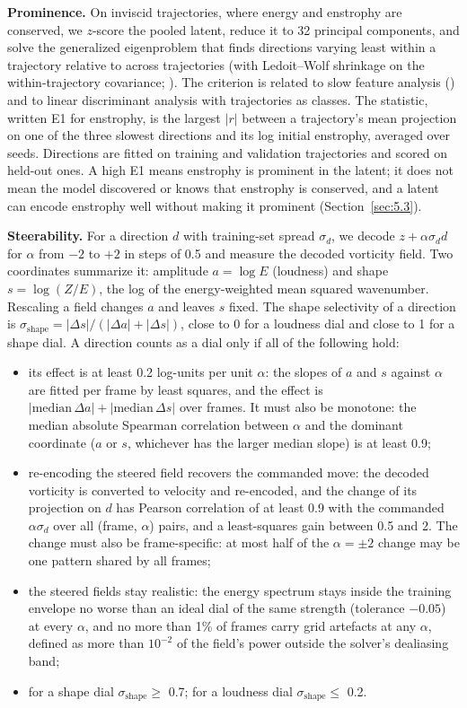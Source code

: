 \documentclass[10pt]{article}
\begin{document}
\textbf{Prominence.} On inviscid trajectories, where energy and enstrophy are conserved, we $z$-score the pooled latent, reduce it to 32 principal components, and solve the generalized eigenproblem that finds directions varying least within a trajectory relative to across trajectories (with Ledoit--Wolf shrinkage on the within-trajectory covariance; \citealp{ledoit2004}). The criterion is related to slow feature analysis (\citealp{wiskott2002sfa}) and to linear discriminant analysis with trajectories as classes. The statistic, written E1 for enstrophy, is the largest $|r|$ between a trajectory's mean projection on one of the three slowest directions and its log initial enstrophy, averaged over seeds. Directions are fitted on training and validation trajectories and scored on held-out ones. A high E1 means enstrophy is prominent in the latent; it does not mean the model discovered or knows that enstrophy is conserved, and a latent can encode enstrophy well without making it prominent (Section~\ref{sec:5.3}).

\textbf{Steerability.} For a direction $d$ with training-set spread $\sigma_d$, we decode $z + \alpha\sigma_d d$ for $\alpha$ from $-2$ to $+2$ in steps of 0.5 and measure the decoded vorticity field. Two coordinates summarize it: amplitude $a = \log E$ (loudness) and shape $s = \log(Z/E)$, the log of the energy-weighted mean squared wavenumber. Rescaling a field changes $a$ and leaves $s$ fixed. The shape selectivity of a direction is $\sigma_{\mathrm{shape}} = |\Delta s| / (|\Delta a| + |\Delta s|)$, close to 0 for a loudness dial and close to 1 for a shape dial. A direction counts as a dial only if all of the following hold:

\begin{itemize}
\item its effect is at least 0.2 log-units per unit $\alpha$: the slopes of $a$ and $s$ against $\alpha$ are fitted per frame by least squares, and the effect is $|\mathrm{median}\,\Delta a| + |\mathrm{median}\,\Delta s|$ over frames. It must also be monotone: the median absolute Spearman correlation between $\alpha$ and the dominant coordinate ($a$ or $s$, whichever has the larger median slope) is at least 0.9;
\item re-encoding the steered field recovers the commanded move: the decoded vorticity is converted to velocity and re-encoded, and the change of its projection on $d$ has Pearson correlation of at least 0.9 with the commanded $\alpha\sigma_d$ over all (frame, $\alpha$) pairs, and a least-squares gain between 0.5 and 2. The change must also be frame-specific: at most half of the $\alpha = \pm 2$ change may be one pattern shared by all frames;
\item the steered fields stay realistic: the energy spectrum stays inside the training envelope no worse than an ideal dial of the same strength (tolerance $-0.05$) at every $\alpha$, and no more than 1\% of frames carry grid artefacts at any $\alpha$, defined as more than $10^{-2}$ of the field's power outside the solver's dealiasing band;
\item for a shape dial $\sigma_{\mathrm{shape}} \geq$ 0.7; for a loudness dial $\sigma_{\mathrm{shape}} \leq$ 0.2.
\end{itemize}
\end{document}
